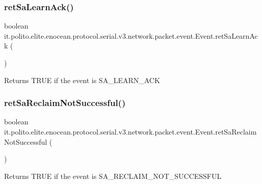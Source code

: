 \subsubsection{\texorpdfstring{ret\+Sa\+Learn\+Ack()}{retSaLearnAck()}}
{\footnotesize\ttfamily boolean it.\+polito.\+elite.\+enocean.\+protocol.\+serial.\+v3.\+network.\+packet.\+event.\+Event.\+ret\+Sa\+Learn\+Ack (\begin{DoxyParamCaption}{ }\end{DoxyParamCaption})}

\begin{DoxyReturn}{Returns}
T\+R\+UE if the event is S\+A\+\_\+\+L\+E\+A\+R\+N\+\_\+\+A\+CK 
\end{DoxyReturn}
\hypertarget{classit_1_1polito_1_1elite_1_1enocean_1_1protocol_1_1serial_1_1v3_1_1network_1_1packet_1_1event_1_1_event_ab336479bff8f3aaa08fe96516e186083}{}\label{classit_1_1polito_1_1elite_1_1enocean_1_1protocol_1_1serial_1_1v3_1_1network_1_1packet_1_1event_1_1_event_ab336479bff8f3aaa08fe96516e186083} 
\subsubsection{\texorpdfstring{ret\+Sa\+Reclaim\+Not\+Successful()}{retSaReclaimNotSuccessful()}}
{\footnotesize\ttfamily boolean it.\+polito.\+elite.\+enocean.\+protocol.\+serial.\+v3.\+network.\+packet.\+event.\+Event.\+ret\+Sa\+Reclaim\+Not\+Successful (\begin{DoxyParamCaption}{ }\end{DoxyParamCaption})}

\begin{DoxyReturn}{Returns}
T\+R\+UE if the event is S\+A\+\_\+\+R\+E\+C\+L\+A\+I\+M\+\_\+\+N\+O\+T\+\_\+\+S\+U\+C\+C\+E\+S\+S\+F\+UL 
\end{DoxyReturn}
\hypertarget{classit_1_1polito_1_1elite_1_1enocean_1_1protocol_1_1serial_1_1v3_1_1network_1_1packet_1_1event_1_1_event_adf76dad65f060f601b159fb88ae66e21}{}\label{classit_1_1polito_1_1elite_1_1enocean_1_1protocol_1_1serial_1_1v3_1_1network_1_1packet_1_1event_1_1_event_adf76dad65f060f601b159fb88ae66e21} 
